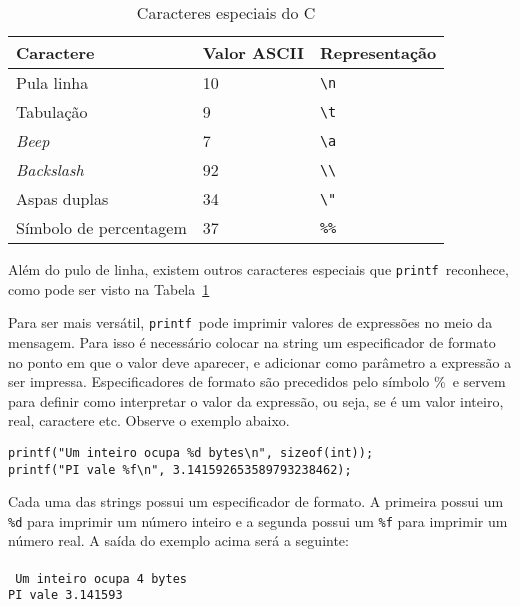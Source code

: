 \documentclass{book}
\newcommand{\PRINTF}{{\tt printf}}
\begin{document}
\begin{table}
\centering
  \begin{tabular}{|l|l|l|}
    \hline
        Caractere               & Valor ASCII & Representação \\
    \hline
        Pula linha              & 10          & \verb|\n|     \\
        Tabulação               & 9           & \verb|\t|     \\
        {\it Beep}              & 7           & \verb|\a|     \\
        {\it Backslash}         & 92          & \verb|\\|     \\
        Aspas duplas            & 34          & \verb|\"|     \\
        Símbolo de percentagem  & 37          & \verb|%%|     \\
    \hline
  \end{tabular}
  \caption{Caracteres especiais do C}
  \label{tab:chars}
\end{table}


Além do pulo de linha, existem outros caracteres especiais que \PRINTF\ reconhece, como pode ser visto na Tabela~\ref{tab:chars}

\pagebreak

Para ser mais versátil, \PRINTF\ pode imprimir valores de expressões no meio da mensagem. Para isso é necessário colocar na string um especificador de formato no ponto em que o valor deve aparecer, e adicionar como parâmetro a expressão a ser impressa. Especificadores de formato são precedidos pelo símbolo \%\ e servem para definir como interpretar o valor da expressão, ou seja, se é um valor inteiro, real, caractere etc. Observe o exemplo abaixo.

\begin{lstlisting}
printf("Um inteiro ocupa %d bytes\n", sizeof(int));
printf("PI vale %f\n", 3.141592653589793238462);
\end{lstlisting}

Cada uma das strings possui um especificador de formato. A primeira possui um {\tt \%d} 
para imprimir um número inteiro e a segunda possui um {\tt \%f}
para imprimir um número real.
A saída do exemplo acima será a seguinte:\\
\\
{\tt
Um inteiro ocupa 4 bytes\\
PI vale 3.141593\\
}
\end{document}
